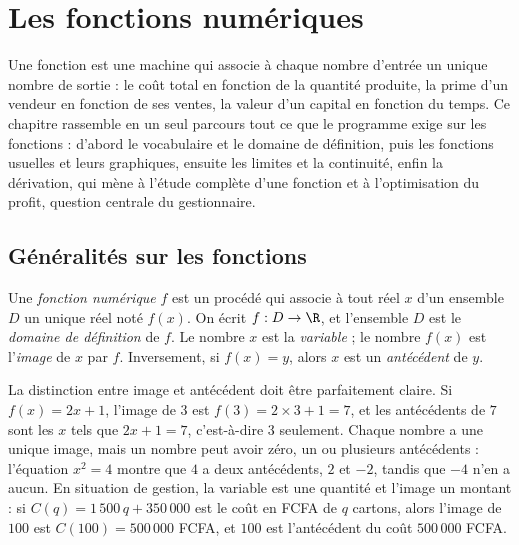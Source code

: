\chapter{Les fonctions numériques}

\begin{quelqueslignes}
Une fonction est une machine qui associe à chaque nombre d'entrée un unique nombre de sortie : le coût total en fonction de la quantité produite, la prime d'un vendeur en fonction de ses ventes, la valeur d'un capital en fonction du temps. Ce chapitre rassemble en un seul parcours tout ce que le programme exige sur les fonctions : d'abord le vocabulaire et le domaine de définition, puis les fonctions usuelles et leurs graphiques, ensuite les limites et la continuité, enfin la dérivation, qui mène à l'étude complète d'une fonction et à l'optimisation du profit, question centrale du gestionnaire.
\end{quelqueslignes}

\section{Généralités sur les fonctions}

\begin{definition}
Une \emph{fonction numérique} $f$ est un procédé qui associe à tout réel $x$ d'un ensemble $D$ un unique réel noté $f(x)$. On écrit $f : D \to \R$, et l'ensemble $D$ est le \emph{domaine de définition} de $f$. Le nombre $x$ est la \emph{variable} ; le nombre $f(x)$ est l'\emph{image} de $x$ par $f$. Inversement, si $f(x) = y$, alors $x$ est un \emph{antécédent} de $y$.
\end{definition}

La distinction entre image et antécédent doit être parfaitement claire. Si $f(x) = 2x + 1$, l'image de $3$ est $f(3) = 2 \times 3 + 1 = 7$, et les antécédents de $7$ sont les $x$ tels que $2x + 1 = 7$, c'est-à-dire $3$ seulement. Chaque nombre a une unique image, mais un nombre peut avoir zéro, un ou plusieurs antécédents : l'équation $x^{2} = 4$ montre que $4$ a deux antécédents, $2$ et $-2$, tandis que $-4$ n'en a aucun. En situation de gestion, la variable est une quantité et l'image un montant : si $C(q) = 1\,500\,q + 350\,000$ est le coût en FCFA de $q$ cartons, alors l'image de $100$ est $C(100) = 500\,000$ FCFA, et $100$ est l'antécédent du coût $500\,000$ FCFA.

